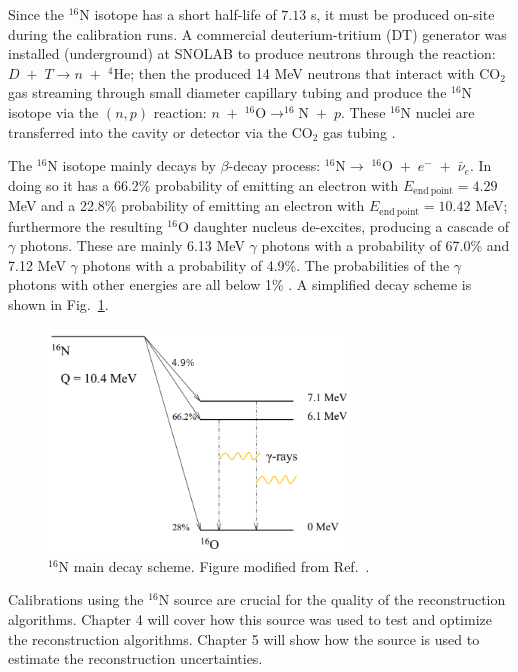 Since the $^{16}$N isotope has a short half-life of $7.13$ s, it must be produced on-site during the calibration runs. A commercial deuterium-tritium (DT) generator was installed (underground) at SNOLAB to produce neutrons through the reaction: $D \;+ \;T\to n \; + \; ^{4}\mathrm{He}$; then the produced 14 MeV neutrons that interact with CO$_2$ gas streaming through small diameter capillary tubing and produce the $^{16}$N isotope via the $(n,p)$ reaction: $n \; + \; ^{16}\mathrm{O} \to ^{16}\mathrm{N} \; + \;p$. These $^{16}$N nuclei are transferred into the cavity or detector via the CO$_2$ gas tubing \cite{dragowsky200216n}.

The $^{16}$N isotope mainly decays by $\beta$-decay process: $^{16}\mathrm{N}\to \; ^{16}\mathrm{O}\; + \; e^- \;+ \;\bar{\nu}_e$. In doing so it has a 66.2\% probability of emitting an electron with $E_{\mathrm{end~point}}=4.29$ MeV and a 22.8\% probability of emitting an electron with $E_{\mathrm{end~point}}=10.42$ MeV; furthermore the resulting $^{16}$O daughter nucleus de-excites, producing a cascade of $\gamma$ photons. These are mainly 6.13 MeV $\gamma$ photons with a probability of 67.0\% and 7.12 MeV $\gamma$ photons with a probability of 4.9\%. The probabilities of the $\gamma$ photons with other energies are all below 1\% \cite{nndc}. A simplified decay scheme is shown in Fig.~\ref{n16decay}.

\begin{figure}[!htb]
	\centering
	\includegraphics[width=8cm]{n16_decay.png}
	\caption[$^{16}$N main decay scheme.]{$^{16}$N main decay scheme. Figure modified from Ref.~\cite{dragowsky200216n}.}
	\label{n16decay}
\end{figure}

Calibrations using the $^{16}$N source are crucial for the quality of the reconstruction algorithms. Chapter 4 will cover how this source was used to test and optimize the reconstruction algorithms. Chapter 5 will show how the source is used to estimate the reconstruction uncertainties.

